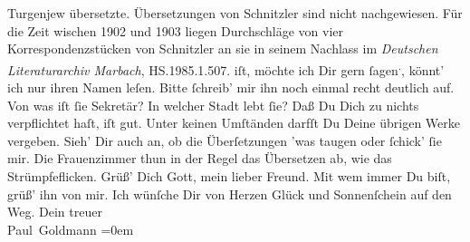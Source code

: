 \begin{ledgroupsized}[t]{13cm}
{{{                     Turgenjew übersetzte. Übersetzungen von
                     Schnitzler sind nicht nachgewiesen. Für
                  die Zeit wischen 1902 und 1903
                  liegen Durchschläge von vier Korrespondenzstücken von Schnitzler an sie in seinem Nachlass im \emph{Deutschen Literaturarchiv Marbach},
                  HS.1985.1.507.}}}\label{K_L02739-4h} iſt, möchte ich Dir gern ſagen\substVorne{}\textsuperscript{.}\substDazwischen{},\substHinten{} könnt’ ich nur ihren Namen leſen. Bitte ſchreib’ mir ihn noch einmal recht
               deutlich auf. Von was iſt ſie Sekretär? In welcher Stadt lebt ſie? Daß Du Dich zu nichts verpflichtet
               haſt, iſt gut. Unter keinen Umſtänden {\pb}darfſt Du
               Deine übrigen Werke vergeben. Sieh’ Dir auch an, ob die Überſetzungen ’was taugen
               oder ſchick’ ſie mir. Die Frauenzimmer thun in der Regel das Übersetzen ab, wie das
               Strümpfeflicken.\pend
           \pstart
           Grüß’ Dich Gott, mein lieber Freund. Mit wem immer Du biſt, grüß’ ihn von mir. Ich
               wünſche Dir von Herzen Glück und Sonnenſchein auf den Weg.\pend
           \pstart
           Dein treuer {\\[\baselineskip]}\spacefill\mbox{Paul Goldmann}\pend
           \leftskip=0em{}
         
         \endnumbering{}\end{ledgroupsized}  \newcommand{\dateiname}{L02739}\newcommand{\titel}{Paul Goldmann an Arthur Schnitzler, 6. 7. [1895]}\newcommand{\editorInnen}{Martin Anton Müller und Laura Untner}
      